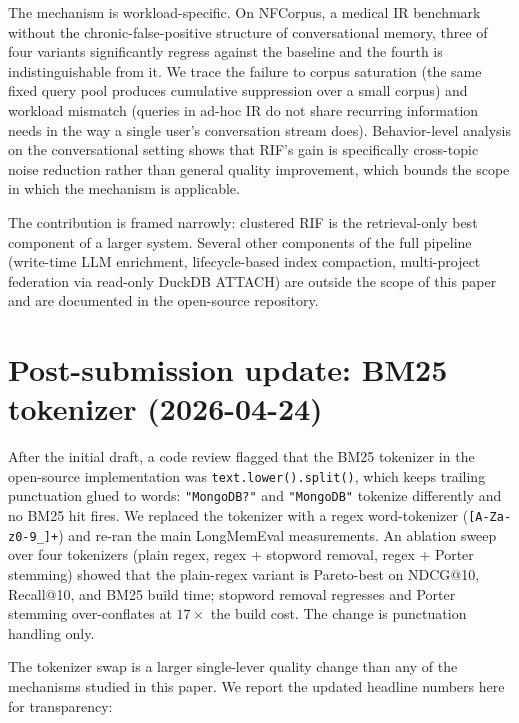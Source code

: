 \documentclass[11pt,a4paper]{article}
\begin{document}
The mechanism is workload-specific. On NFCorpus, a medical IR benchmark without the chronic-false-positive structure of conversational memory, three of four variants significantly regress against the baseline and the fourth is indistinguishable from it. We trace the failure to corpus saturation (the same fixed query pool produces cumulative suppression over a small corpus) and workload mismatch (queries in ad-hoc IR do not share recurring information needs in the way a single user's conversation stream does). Behavior-level analysis on the conversational setting shows that RIF's gain is specifically cross-topic noise reduction rather than general quality improvement, which bounds the scope in which the mechanism is applicable.

The contribution is framed narrowly: clustered RIF is the retrieval-only best component of a larger system. Several other components of the full pipeline (write-time LLM enrichment, lifecycle-based index compaction, multi-project federation via read-only DuckDB ATTACH) are outside the scope of this paper and are documented in the open-source repository.

\section*{Post-submission update: BM25 tokenizer (2026-04-24)}
\label{sec:post-update}

After the initial draft, a code review flagged that the BM25 tokenizer in the open-source implementation was \texttt{text.lower().split()}, which keeps trailing punctuation glued to words: \texttt{"MongoDB?"} and \texttt{"MongoDB"} tokenize differently and no BM25 hit fires. We replaced the tokenizer with a regex word-tokenizer (\texttt{[A-Za-z0-9\_]+}) and re-ran the main LongMemEval measurements. An ablation sweep over four tokenizers (plain regex, regex + stopword removal, regex + Porter stemming) showed that the plain-regex variant is Pareto-best on NDCG@10, Recall@10, and BM25 build time; stopword removal regresses and Porter stemming over-conflates at $17\times$ the build cost. The change is punctuation handling only.

The tokenizer swap is a larger single-lever quality change than any of the mechanisms studied in this paper. We report the updated headline numbers here for transparency:
\end{document}
